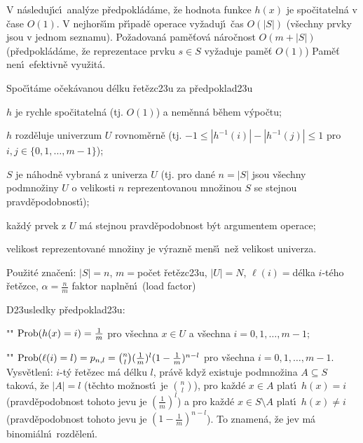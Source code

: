 \documentclass[a4paper,12pt]{article}
\begin{document}
\flushpar V n\'asleduj\'\i c\'\i\ anal\'yze p\v redpokl\'ad\'ame, \v ze hodnota funkce $
h(x)$ 
je spo\v citateln\'a v \v case $O(1)$.\newline 
V nejhor\v s\'\i m p\v r\'\i pad\v e operace vy\v zaduj\'\i\ \v cas $
O(|S|)$ 
(v\v sechny prv\-ky jsou v jednom seznamu). \newline 
Po\v zadovan\'a pam\v e\v tov\'a n\'aro\v cnost $O(m+|S|)$ 
(p\v redpokl\'ad\'ame, \v ze reprezentace prvku $s\in S$ vy\v zaduje pam\v e\v t $
O(1)$)\newline 
Pam\v e\v t nen\'\i\ efektivn\v e vyu\v zit\'a.
\smallskip

\flushpar Spo\v c\'\i t\'ame o\v cek\'avanou d\'elku \v ret\v ezc\accent23u za 
p\v redpoklad\accent23u
\roster
\item
$h$ je rychle spo\v citateln\'a (tj. $O(1)$) a nem\v enn\'a b\v ehem 
v\'ypo\v ctu;
\item
$h$ rozd\v eluje univerzum $U$ rovnom\v ern\v e (tj. 
$-1\le |h^{-1}(i)|-|h^{-1}(j)|\le 1$ pro $i,j\in \{0,1,\dots,m-1\}$);
\item
$S$ je n\'ahodn\v e vybran\'a z univerza $U$ (tj. pro dan\'e $n=|
S|$ 
jsou v\v sechny podmno\v zi\-ny $U$ o velikosti $n$ reprezentovanou 
mno\v zinou $S$ se stejnou pravd\v epodobnost\'\i );\item
ka\v zd\'y prvek z $U$ m\'a stejnou pravd\v epodobnost b\'yt 
argumentem operace;
\item
velikost reprezentovan\'e mno\v ziny je v\'yrazn\v e men\v s\'\i\ ne\v z 
velikost univerza.
\endroster


\flushpar Pou\v zit\'e zna\v cen\'\i : $|S|=n$, $m=$po\v cet 
\v ret\v ezc\accent23u, $|U|=N$,\newline 
$\ell (i)=$d\'elka $i$-t\'eho \v ret\v ezce, $\alpha =\frac nm$ faktor napln\v en\'\i\ (load factor)
\smallskip

\flushpar D\accent23usledky p\v redpoklad\accent23u:
\roster
\item"{}"
$\operatorname{Prob}(h(x)=i)=\frac 1m$ pro v\v sechna $x\in U$ a v\v sechna 
$i=0,1,\dots,m-1$; 
\item"{}"
$\operatorname{Prob}(\ell (i)=l)=p_{n,l}=\binom nl(\frac 1m)^l(1-\frac 1m)^{n-l}$ 
pro v\v sechna $i=0,1,\dots,m-1$.
\endroster
\flushpar Vysv\v etlen\'\i : $i$-t\'y \v ret\v ezec m\'a d\'elku $
l$, pr\'av\v e kdy\v z existuje 
pod\-mno\-\v zina $A\subseteq S$ takov\'a, \v ze $|A|=l$ (t\v echto mo\v znost\'\i\ je 
$\binom nl$), pro ka\v zd\'e $x\in A$ plat\'\i\ $h(x)=i$ (pravd\v epodobnost 
tohoto jevu je $(\frac 1m)^l$) a pro ka\v zd\'e $x\in S\setminus 
A$ plat\'\i\ $h(x)\ne i$ 
(pravd\v epodobnost tohoto jevu je $(1-\frac 1m)^{n-l}$). To znamen\'a, \v ze jev m\'a 
binomi\'aln\'\i\ rozd\v elen\'\i .
\medskip
\end{document}
